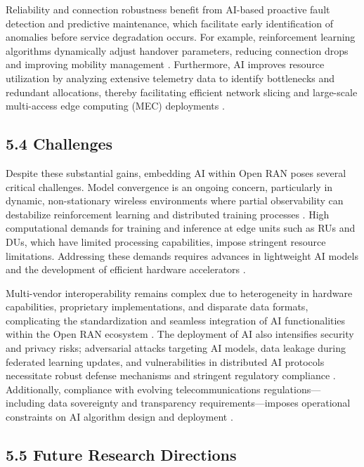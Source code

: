 \documentclass[11pt]{article}
\begin{document}
\begin{itemize}
Reliability and connection robustness benefit from AI-based proactive fault detection and predictive maintenance, which facilitate early identification of anomalies before service degradation occurs. For example, reinforcement learning algorithms dynamically adjust handover parameters, reducing connection drops and improving mobility management \cite{ref54}. Furthermore, AI improves resource utilization by analyzing extensive telemetry data to identify bottlenecks and redundant allocations, thereby facilitating efficient network slicing and large-scale multi-access edge computing (MEC) deployments \cite{ref49}.

\subsection{5.4 Challenges}

Despite these substantial gains, embedding AI within Open RAN poses several critical challenges. Model convergence is an ongoing concern, particularly in dynamic, non-stationary wireless environments where partial observability can destabilize reinforcement learning and distributed training processes \cite{ref54}. High computational demands for training and inference at edge units such as RUs and DUs, which have limited processing capabilities, impose stringent resource limitations. Addressing these demands requires advances in lightweight AI models and the development of efficient hardware accelerators \cite{ref48}.

Multi-vendor interoperability remains complex due to heterogeneity in hardware capabilities, proprietary implementations, and disparate data formats, complicating the standardization and seamless integration of AI functionalities within the Open RAN ecosystem \cite{ref49}. The deployment of AI also intensifies security and privacy risks; adversarial attacks targeting AI models, data leakage during federated learning updates, and vulnerabilities in distributed AI protocols necessitate robust defense mechanisms and stringent regulatory compliance \cite{ref50}. Additionally, compliance with evolving telecommunications regulations—including data sovereignty and transparency requirements—imposes operational constraints on AI algorithm design and deployment \cite{ref48}.

\subsection{5.5 Future Research Directions}


\end{itemize}
\end{document}

